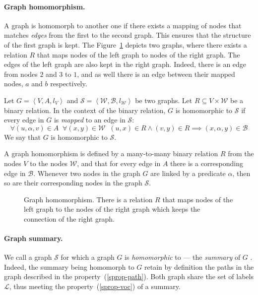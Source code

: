 \paragraph{Graph homomorphism.}

A graph is homomorph to another one if there exists a mapping of nodes that matches \emph{edges} from the first to the second graph. This ensures that the structure of the first graph is kept.
The Figure~\ref{fig:homomorphism} depicts two graphs, where there exists a relation $R$ that maps nodes of the left graph to nodes of the right graph. The edges of the left graph are also kept in the right graph. Indeed, there is an edge from nodes $2$ and $3$ to $1$, and as well there is an edge between their mapped nodes, $a$ and $b$ respectively.

\begin{definition}
	Let $G=\left\langle V, A, l_V \right\rangle$ and $\mathcal{S}=\left\langle \mathcal{W}, \mathcal{B}, l_\mathcal{W} \right\rangle$ be two graphs. Let $R \subseteq V \times \mathcal{W}$ be a binary relation.
	In the context of the binary relation, $G$ is homomorphic to $\mathcal{S}$ if every edge in $G$ is \emph{mapped} to an edge in $\mathcal{S}$:
	$$
	\forall (u, \alpha, v) \in A\;\; \forall (x, y) \in \mathcal{W}\;\; (u, x) \in R \wedge (v, y) \in R \implies (x, \alpha, y) \in \mathcal{B}
	$$
	We say that $G$ is homomorphic to $\mathcal{S}$.
\end{definition}

A graph homomorphism is defined by a many-to-many binary relation $R$ from the nodes $V$ to the nodes $\mathcal{W}$, and that for every edge in $A$ there is a corresponding edge in $\mathcal{B}$. Whenever two nodes in the graph $G$ are linked by a predicate $\alpha$, then so are their corresponding nodes in the graph $\mathcal{S}$.\\

\begin{figure}
	\centering
	
	\caption{Graph homomorphism. There is a relation $R$ that maps nodes of the left graph to the nodes of the right graph which keeps the connection of the right graph.}
	\label{fig:homomorphism}
\end{figure}

\paragraph{Graph summary.}

We call a graph $\mathcal{S}$ for which a graph $G$ is \emph{homomorphic} to --- the \emph{summary} of $G$ \cite{campinas:2012:dexa}. Indeed, the summary being homomorph to $G$ retain by definition the paths in the graph described in the property~(\ref{sprop-path}). Both graph share the set of labels $\mathcal{L}$, thus meeting the property~(\ref{sprop-voc}) of a summary.

